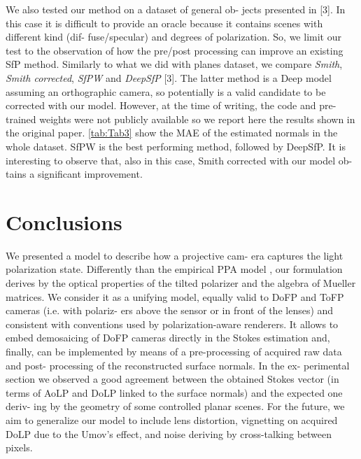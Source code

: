 \documentclass[letterpaper, 6 pt, journal, twoside]{IEEEtran}
\begin{document}
    We also tested our method on a dataset of general ob-
jects presented in [3]. In this case it is difficult to provide an
oracle because it contains scenes with different kind (dif-
fuse/specular) and degrees of polarization. So, we limit
our test to the observation of how the pre/post processing
can improve an existing SfP method. Similarly to what we
did with planes dataset, we compare \textit{Smith}, \textit{Smith corrected},
\textit{SfPW} and \textit{DeepSfP} [3]. The latter method is a Deep model
assuming an orthographic camera, so potentially is a valid
candidate to be corrected with our model. However, at the
time of writing, the code and pre-trained weights were not
publicly available so we report here the results shown in
the original paper. \cref{tab:Tab3} show the MAE of the estimated
normals in the whole dataset. SfPW is the best performing
method, followed by DeepSfP. It is interesting to observe
that, also in this case, Smith corrected with our model ob-
tains a significant improvement.

\section{Conclusions}

    We presented a model to describe how a projective cam-
era captures the light polarization state. Differently than
the empirical PPA model \cite{atkinson2006recovery}, our formulation derives by
the optical properties of the tilted polarizer and the algebra
of Mueller matrices. We consider it as a unifying model,
equally valid to DoFP and ToFP cameras (i.e. with polariz-
ers above the sensor or in front of the lenses) and consistent
with conventions used by polarization-aware renderers. It
allows to embed demosaicing of DoFP cameras directly in
the Stokes estimation and, finally, can be implemented by
means of a pre-processing of acquired raw data and post-
processing of the reconstructed surface normals. In the ex-
perimental section we observed a good agreement between
the obtained Stokes vector (in terms of AoLP and DoLP
linked to the surface normals) and the expected one deriv-
ing by the geometry of some controlled planar scenes. For
the future, we aim to generalize our model to include lens
distortion, vignetting on acquired DoLP due to the Umov’s
effect, and noise deriving by cross-talking between pixels.


{\small


}
\end{document}
